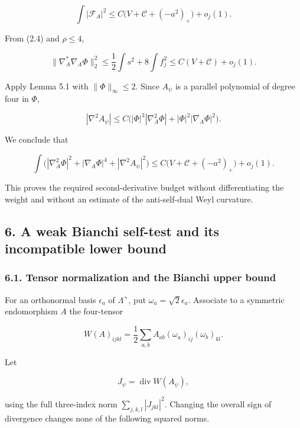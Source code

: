 \documentclass[
  10pt,
]{article}
\begin{document}
\[
             \int|\mathscr F_A|^2
               \le C\bigl(V+\mathcal C+(-a^2)_+\bigr)+o_j(1).
 \tag{5.7}
\]

From (2.4) and \(\rho\le4\),

\[
 \|\nabla_A^*\nabla_A\Phi\|_2^2
       \le\frac12\int s^2+8\int f_j^2
       \le C(V+\mathcal C)+o_j(1).                        \tag{5.8}
\]

Apply Lemma 5.1 with \(\|\Phi\|_\infty\le2\). Since \(A_\psi\) is a
parallel polynomial of degree four in \(\Phi\),

\[
 |\nabla^2A_\psi|
      \le C\bigl(|\Phi|^3|\nabla_A^2\Phi|
                               +|\Phi|^2|\nabla_A\Phi|^2\bigr).
\]

We conclude that

\[
 \int\bigl(|\nabla_A^2\Phi|^2+|\nabla_A\Phi|^4
                                      +|\nabla^2A_\psi|^2\bigr)
       \le C\bigl(V+\mathcal C+(-a^2)_+\bigr)+o_j(1).
 \tag{5.9}
\]

This proves the required second-derivative budget without
differentiating the weight and without an estimate of the anti-self-dual
Weyl curvature.

\hypertarget{a-weak-bianchi-self-test-and-its-incompatible-lower-bound}{%
\subsection{6. A weak Bianchi self-test and its incompatible lower
bound}\label{a-weak-bianchi-self-test-and-its-incompatible-lower-bound}}

\hypertarget{tensor-normalization-and-the-bianchi-upper-bound}{%
\subsubsection{6.1. Tensor normalization and the Bianchi upper
bound}\label{tensor-normalization-and-the-bianchi-upper-bound}}

For an orthonormal basis \(\epsilon_a\) of \(\Lambda^+\), put
\(\omega_a=\sqrt2\epsilon_a\). Associate to a symmetric endomorphism
\(A\) the four-tensor

\[
 W(A)_{ijkl}=\frac12\sum_{a,b}A_{ab}(\omega_a)_{ij}(\omega_b)_{kl}.
 \tag{6.1}
\]

Let

\[
                    J_\psi=\operatorname{div}W(A_\psi),
\]

using the full three-index norm \(\sum_{j,k,l}|J_{jkl}|^2\). Changing
the overall sign of divergence changes none of the following squared
norms.
\end{document}
